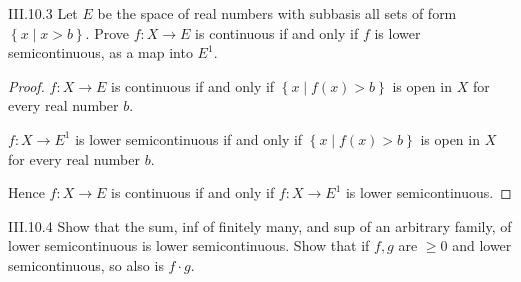 \begin{problem}{III.10.3}
Let \(E\) be the space of real numbers with subbasis all sets of form \( \left\{ x \mid x > b \right\} \). Prove \( f: X \to E \) is continuous if and only if \(f\) is lower semicontinuous, as a map into \( E^{1} \).
\end{problem}

\begin{proof}
    \( f: X \to E \) is continuous if and only if \( \left\{ x \mid f(x) > b \right\} \) is open in \( X \) for every real number \( b \).

    \( f: X \to E^{1} \) is lower semicontinuous if and only if \( \left\{ x \mid f(x) > b \right\} \) is open in \( X \) for every real number \( b \).

    Hence  \( f: X \to E \) is continuous if and only if \( f: X \to E^{1} \) is lower semicontinuous.
\end{proof}

\begin{problem}{III.10.4}\label{problem:III.10.4}
Show that the sum, inf of finitely many, and sup of an arbitrary family, of lower semicontinuous is lower semicontinuous. Show that if \( f, g \) are \( \ge 0 \) and lower semicontinuous, so also is \( f \cdot g \).
\end{problem}

